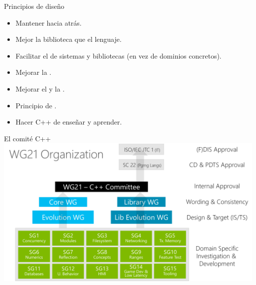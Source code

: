 \begin{frame}[t]{Principios de diseño}
\begin{itemize}
  \item \vfill\pause  Mantener  hacia atrás.
  \item \vfill\pause  Mejor  la biblioteca que el lenguaje.
  \item \vfill\pause  Facilitar el  de sistemas y bibliotecas (en vez de dominios concretos).
  \item \vfill\pause  Mejorar la .
  \item \vfill\pause  Mejorar el  y la .
  \item \vfill\pause  Principio de .
  \item \vfill\pause  Hacer C++  de enseñar y aprender.
\end{itemize}
\end{frame}

\begin{frame}{El comité C++}
\includegraphics[width=\textwidth]{img/wg21-structure.png}
\end{frame}

